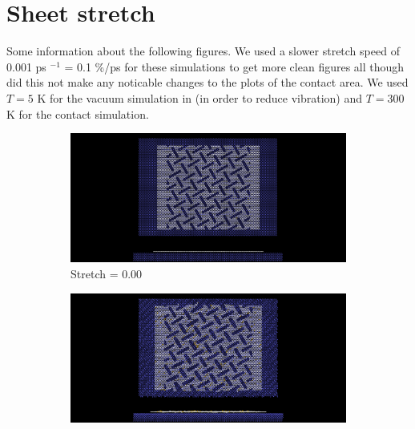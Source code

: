 \section{Sheet stretch}\label{sec:sheet_stretch}


Some information about the following figures. We used a slower stretch speed of 0.001 ps $^{-1}$ = 0.1 \%/ps for these simulations to get more clean figures all though did this not make any noticable changes to the plots of the contact area. We used $T = 5$ K for the vacuum simulation in (in order to reduce vibration) and $T = 300$ K for the contact simulation.

\newpage



\begin{figure}[H]
    \centering
    \begin{subfigure}[b]{0.49\textwidth}
        \centering
        \includegraphics[width=\textwidth]{figures/baseline/contact_vs_stretch/popup/pop_stretch0000.png}
        \caption{Stretch = 0.00}
        \label{fig:}
    \end{subfigure}
    \hfill
    \begin{subfigure}[b]{0.49\textwidth}
        \centering
        \includegraphics[width=\textwidth]{figures/baseline/contact_vs_stretch/popup/pop_stretch0006.png}

\end{subfigure}
\end{figure}
